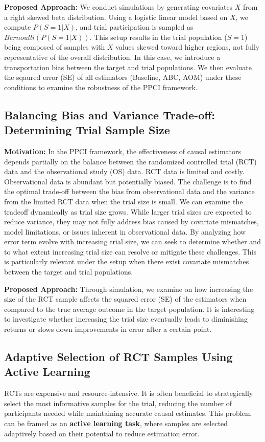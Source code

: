 \documentclass[12pt, oneside]{amsart}
\theoremstyle{definition}
\theoremstyle{remark}
\numberwithin{equation}{section}
\begin{document}
\textbf{Proposed Approach:} We conduct simulations by generating covariates $X$ from a right skewed beta distribution. Using a logistic linear model based on $X$, we compute $P(S=1|X)$, and trial participation is sampled as $Bernoulli(P(S=1|X))$. This setup results in the trial population ($S=1$) being composed of samples with $X$ values skewed toward higher regions, not fully representative of the overall distribution. In this case, we introduce a transportation bias between the target and trial populations. We then evaluate the sqaured error (SE) of all estimators (Baseline, ABC, AOM) under these conditions to examine the robustness of the PPCI framework.

\subsection{Balancing Bias and Variance Trade-off: Determining Trial Sample Size}
\textbf{Motivation:} In the PPCI framework, the effectiveness of causal estimators depends partially on the balance between the randomized controlled trial (RCT) data and the observational study (OS) data. RCT data is limited and costly. Observational data is abundant but potentially biased. The challenge is to find the optimal trade-off between the bias from observational data and the variance from the limited RCT data when the trial size is small. We can examine the tradeoff dynamically as trial size grows. While larger trial sizes are expected to reduce variance, they may not fully address bias caused by covariate mismatches, model limitations, or issues inherent in observational data. By analyzing how error term evolve with increasing trial size, we can seek to determine whether and to what extent increasing trial size can resolve or mitigate these challenges. This is particularly relevant under the setup when there exist covariate mismatches between the target and trial populations. 

\textbf{Proposed Approach:} Through simulation, we examine on how increasing the size of the RCT sample affects the squared error (SE) of the estimators when compared to the true average outcome in the target population. It is interesting to investigate whether increasing the trial size eventually leads to diminishing returns or slows down improvements in error after a certain point.


\subsection{Adaptive Selection of RCT Samples Using Active Learning}
RCTs are expensive and resource-intensive. It is often beneficial to strategically select the most informative samples for the trial, reducing the number of participants needed while maintaining accurate causal estimates. This problem can be framed as an \textbf{active learning task}, where samples are selected adaptively based on their potential to reduce estimation error.
\end{document}
